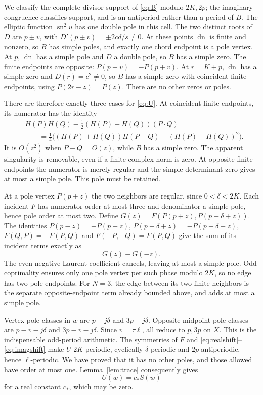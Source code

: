 \documentclass[11pt,letterpaper]{article}
\DeclareMathOperator{\sn}{sn}
\DeclareMathOperator{\dn}{dn}
\begin{document}
We classify the complete divisor support of \eqref{eq:B} modulo
$2K,2p$; the imaginary congruence classifies support, and is an
antiperiod rather than a period of $B$.
The elliptic function $\sn^2u$ has one double pole in this cell.
The two distinct roots of $D$ are $p\pm v$, with
$D'(p\pm v)=\pm2cd/s\ne0$. At these points $\dn$ is finite and
nonzero, so $B$ has simple poles, and exactly one chord endpoint
is a pole vertex. At $p$, $\dn$ has a simple pole and $D$ a double
pole, so $B$ has a simple zero. The finite endpoints are opposite:
$P(p-v)=-P(p+v)$. At $r=K+p$, $\dn$ has a simple zero and
$D(r)=c^2\ne0$, so $B$ has a simple zero with coincident finite
endpoints, using $P(2r-z)=P(z)$. There are no other zeros or poles.

There are therefore exactly three cases for \eqref{eq:U}.
At coincident finite endpoints, its numerator has the identity
\begin{equation}\label{eq:polarization}
\begin{aligned}
 &H(P)H(Q)-\tfrac12(H(P)+H(Q))(P\cdot Q)\\
 &\qquad=\tfrac14\bigl((H(P)+H(Q))H(P-Q)-(H(P)-H(Q))^2\bigr).
\end{aligned}
\end{equation}
It is $O(z^2)$ when $P-Q=O(z)$, while $B$ has a simple zero.
The apparent singularity is removable, even if a finite complex
norm is zero. At opposite finite endpoints the numerator is merely
regular and the simple determinant zero gives at most a simple
pole. This pole must be retained.

At a pole vertex $P(p+z)$ the two neighbors are regular, since
$0<\delta<2K$. Each incident $F$ has numerator order at most three
and denominator a simple pole, hence pole order at most two.
Define $G(z)=F(P(p+z),P(p+\delta+z))$.
The identities $P(p-z)=-P(p+z)$,
$P(p-\delta+z)=-P(p+\delta-z)$,
$F(Q,P)=-F(P,Q)$ and $F(-P,-Q)=F(P,Q)$ give the sum of its
incident terms exactly as
\begin{equation}\label{eq:cancellation}
 G(z)-G(-z).
\end{equation}
The even negative Laurent coefficient cancels, leaving at most a
simple pole. Odd coprimality ensures only one pole vertex per
such phase modulo $2K$, so no edge has two pole endpoints.
For $N=3$, the edge between its two finite neighbors is the separate
opposite-endpoint term already bounded above, and adds at most a
simple pole.

Vertex-pole classes in $w$ are $p-j\delta$ and $3p-j\delta$.
Opposite-midpoint pole classes are $p-v-j\delta$ and
$3p-v-j\delta$. Since $v=\tau\ell$, all reduce to $p,3p$ on $X$.
This is the indispensable odd-period arithmetic. The symmetries of
$F$ and \eqref{eq:realshift}--\eqref{eq:imagshift} make $U$
$2K$-periodic, cyclically $\delta$-periodic and $2p$-antiperiodic,
hence $\ell$-periodic. We have proved that it has no other poles,
and those allowed have order at most one.
Lemma~\ref{lem:trace} consequently gives
\begin{equation}\label{eq:antitrace}
 U(w)=c_*S(w)
\end{equation}
for a real constant $c_*$, which may be zero.
\end{document}
